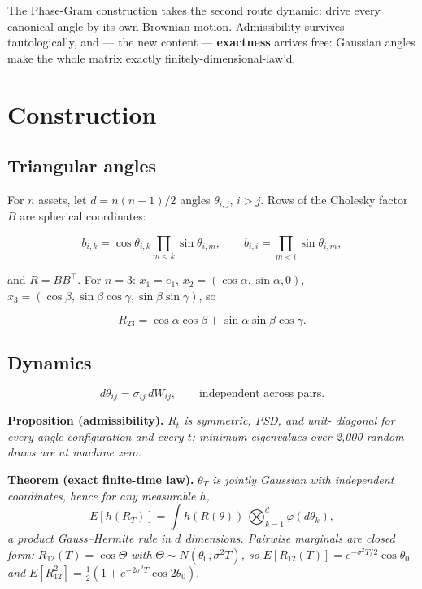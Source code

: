 \documentclass[
  english,
  10pt,
  letterpaper,
  DIV=11,
  numbers=noendperiod]{scrartcl}
\begin{document}
The Phase-Gram construction takes the second route dynamic: drive every
canonical angle by its own Brownian motion. Admissibility survives
tautologically, and --- the new content --- \textbf{exactness} arrives
free: Gaussian angles make the whole matrix exactly
finitely-dimensional-law'd.

\section{Construction}\label{sec-construction}

\subsection{Triangular angles}\label{triangular-angles}

For \(n\) assets, let \(d=n(n-1)/2\) angles \(\theta_{i,j}\), \(i>j\).
Rows of the Cholesky factor \(B\) are spherical coordinates:

\[
b_{i,k}=\cos\theta_{i,k}\prod_{m<k}\sin\theta_{i,m},\qquad
b_{i,i}=\prod_{m<i}\sin\theta_{i,m},
\]

and \(R=B B^\top\). For \(n=3\): \(x_1=e_1\),
\(x_2=(\cos\alpha,\sin\alpha,0)\),
\(x_3=(\cos\beta,\sin\beta\cos\gamma,\sin\beta\sin\gamma)\), so

\[
R_{23}=\cos\alpha\cos\beta+\sin\alpha\sin\beta\cos\gamma .
\]

\subsection{Dynamics}\label{dynamics}

\[
d\theta_{ij}=\sigma_{ij}\,dW_{ij},\qquad \text{independent across pairs.}
\]

\textbf{Proposition (admissibility).} \emph{\(R_t\) is symmetric, PSD,
and unit- diagonal for every angle configuration and every \(t\);
minimum eigenvalues over 2,000 random draws are at machine zero.}

\textbf{Theorem (exact finite-time law).} \emph{\(\theta_T\) is jointly
Gaussian with independent coordinates, hence for any measurable \(h\),}
\[E[h(R_T)] = \int h(R(\theta))\,\bigotimes_{k=1}^{d}\varphi(d\theta_k),\]
\emph{a product Gauss--Hermite rule in \(d\) dimensions. Pairwise
marginals are closed form:} \(R_{12}(T)=\cos\Theta\) \emph{with}
\(\Theta\sim N(\theta_0,\sigma^2T)\)\emph{, so}
\(E[R_{12}(T)]=e^{-\sigma^2T/2}\cos\theta_0\) \emph{and}
\(E[R_{12}^2]=\tfrac12(1+e^{-2\sigma^2T}\cos2\theta_0)\).
\end{document}
